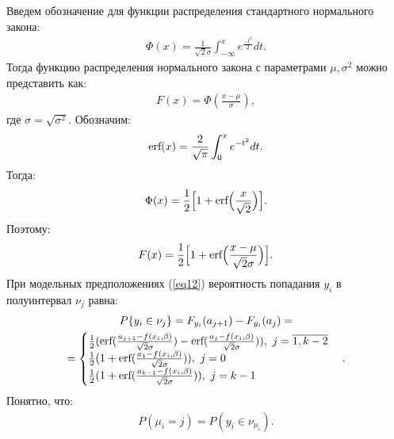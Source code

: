 \documentclass[a4paper,14pt]{extarticle}
\begin{document}
Введем обозначение для функции распределения стандартного нормального закона:
\begin{eqnarray}
    \Phi(x)=\frac{1}{\sqrt{2}\sigma}\int_{-\infty}^{x}e^{\frac{-t^2}{2}}dt.
\end{eqnarray}
Тогда функцию распределения нормального закона с параметрами $\mu,\sigma^2$ можно представить как:
\begin{eqnarray}
    F(x)=\Phi(\frac{x-\mu}{\sigma}),
\end{eqnarray}
где $\sigma = \sqrt{\sigma^2}$. \hfill\break
Обозначим:
\begin{eqnarray}
    \textup{erf}(x)=\frac{2}{\sqrt{\pi}}\int_0^{x}e^{-t^2}dt.
\end{eqnarray}
Тогда:
\begin{eqnarray}
    \Phi(x)= \frac{1}{2} \Big[1+\textup{erf}\Big(\frac{x}{\sqrt{2}} \Big) \Big].
\end{eqnarray}
Поэтому:
\begin{eqnarray}
    F(x)= \frac{1}{2} \Big[1+\textup{erf}\Big(\frac{x-\mu}{\sqrt{2}\sigma} \Big) \Big].
\end{eqnarray}
При модельных предположениях (\ref{eq12}) вероятность попадания $y_i$ в полуинтервал $\nu_j$ равна:
\begin{multline}
    P\{y_i\in\nu_j\}= F_{y_i}(a_{j+1})-F_{y_i}(a_{j})=\\
    =\begin{cases}
        \frac{1}{2}(\textup{erf}(\frac{a_{j+1}-f(x_i,\beta)}{\sqrt{2}\sigma})-\textup{erf}(\frac{a_{j}-f(x_i,\beta)}{\sqrt{2}\sigma})),~j=\overline{1,k-2}\\
        \frac{1}{2}(1+\textup{erf}(\frac{a_{1}-f(x_i,\beta)}{\sqrt{2}\sigma})),~j=0\\
        \frac{1}{2}(1+\textup{erf}(\frac{a_{k-1}-f(x_i,\beta)}{\sqrt{2}\sigma})),~j=k-1
    \end{cases}.
\end{multline}
Понятно, что:
\begin{eqnarray}
    P(\mu_i=j)=P(y_i\in \nu_{\mu_i}).
\end{eqnarray}
\end{document}
